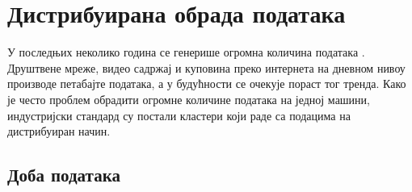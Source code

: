 \documentclass[12pt,oneside]{memoir}
\begin{document}


\chapter{Дистрибуирана обрада података}
\label{chp:dist_sis}

У последњих неколико година се генерише огромна количина података \cite{volume_data}. Друштвене мреже, видео садржај и куповина преко интернета на дневном нивоу производе петабајте података, а у будућности се очекује пораст тог тренда. Како је често проблем обрадити огромне количине података на једној машини, индустријски стандард су постали кластери који раде са подацима на дистрибуиран начин.

\begin{comment}

\begin{center}
\begin{tabular}{|c|c|}
	\hline
 	Мерна јединица меморије & Вредност \\ \hline
	Бит & 0 или 1 \\ \hline
	Бајт & 8 бита \\ \hline 	
 	Килобајт & 1024 бајта \\ \hline
 	Мегабајт & 1024 килобајта \\ \hline
 	Гигабајт & 1024 мегабајта \\ \hline
 	Терабајт & 1024 гигабајта \\ \hline
 	Петабајт & 1024 терабајта \\ \hline
 	Егзабајт & 1024 петабајта \\ \hline
\end{tabular}
\end{center}

\end{comment}


\section{Доба података} %
\label{sec:dist_motivacija}
\end{document}
